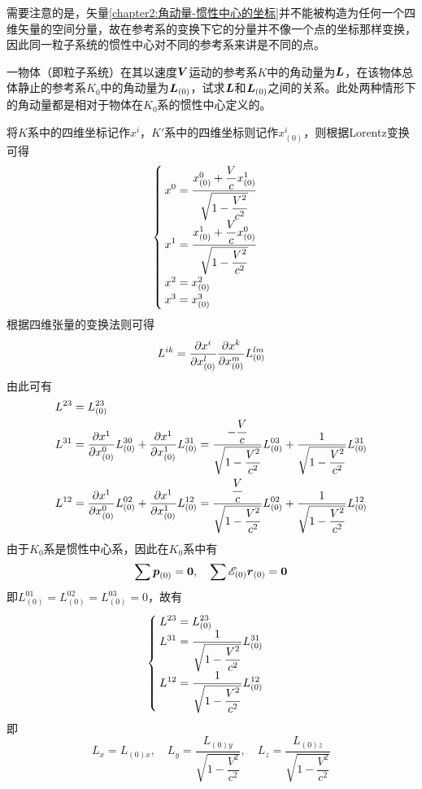 需要注意的是，矢量\eqref{chapter2:角动量-惯性中心的坐标}并不能被构造为任何一个四维矢量的空间分量，故在参考系的变换下它的分量并不像一个点的坐标那样变换，因此同一粒子系统的惯性中心对不同的参考系来讲是不同的点。

\begin{example}
一物体（即粒子系统）在其以速度$\boldsymbol{V}$运动的参考系$K$中的角动量为$\boldsymbol{L}$，在该物体总体静止的参考系$K_0$中的角动量为$\boldsymbol{L}_{(0)}$，试求$\boldsymbol{L}$和$\boldsymbol{L}_{(0)}$之间的关系。此处两种情形下的角动量都是相对于物体在$K_0$系的惯性中心定义的。
\end{example}
\begin{solution}
将$K$系中的四维坐标记作$x^i$，$K'$系中的四维坐标则记作$x^i_{(0)}$，则根据Lorentz变换可得
\begin{equation*}
\begin{cases}
	\displaystyle x^0 = \frac{x^0_{(0)}+\dfrac{V}{c}x^1_{(0)}}{\sqrt{1-\dfrac{V^2}{c^2}}} \\
	\displaystyle x^1 = \frac{x^1_{(0)}+\dfrac{V}{c}x^0_{(0)}}{\sqrt{1-\dfrac{V^2}{c^2}}} \\
	x^2 = x^2_{(0)} \\
	x^3 = x^3_{(0)}
\end{cases}
\end{equation*}
根据四维张量的变换法则可得
\begin{equation*}
	L^{ik} = \frac{\partial x^i}{\partial x^l_{(0)}} \frac{\partial x^k}{\partial x^m_{(0)}} L^{lm}_{(0)}
\end{equation*}
由此可有
\begin{align*}
	L^{23} & = L^{23}_{(0)} \\
	L^{31} & = \frac{\partial x^1}{\partial x^0_{(0)}} L^{30}_{(0)} + \frac{\partial x^1}{\partial x^1_{(0)}} L^{31}_{(0)} = \frac{-\dfrac{V}{c}}{\sqrt{1-\dfrac{V^2}{c^2}}} L^{03}_{(0)} + \frac{1}{\sqrt{1-\dfrac{V^2}{c^2}}} L^{31}_{(0)} \\
	L^{12} & = \frac{\partial x^1}{\partial x^0_{(0)}} L^{02}_{(0)} + \frac{\partial x^1}{\partial x^1_{(0)}} L^{12}_{(0)} = \frac{\dfrac{V}{c}}{\sqrt{1-\dfrac{V^2}{c^2}}} L^{02}_{(0)} + \frac{1}{\sqrt{1-\dfrac{V^2}{c^2}}} L^{12}_{(0)}
\end{align*}
由于$K_0$系是惯性中心系，因此在$K_0$系中有
\begin{equation*}
	\sum \boldsymbol{p}_{(0)} = \boldsymbol{0},\quad \sum \mathscr{E}_{(0)}\boldsymbol{r}_{(0)} = \boldsymbol{0}
\end{equation*}
即$L^{01}_{(0)} = L^{02}_{(0)} = L^{03}_{(0)} = 0$，故有
\begin{equation*}
\begin{cases}
	\displaystyle L^{23} = L^{23}_{(0)} \\
	\displaystyle L^{31} = \frac{1}{\sqrt{1-\dfrac{V^2}{c^2}}} L^{31}_{(0)} \\
	\displaystyle L^{12} = \frac{1}{\sqrt{1-\dfrac{V^2}{c^2}}} L^{12}_{(0)}
\end{cases}
\end{equation*}
即
\begin{equation*}
	L_x = L_{(0)x},\quad L_y = \frac{L_{(0)y}}{\sqrt{1-\dfrac{V^2}{c^2}}} ,\quad L_z = \frac{L_{(0)z}}{\sqrt{1-\dfrac{V^2}{c^2}}}
\end{equation*}
\end{solution}
